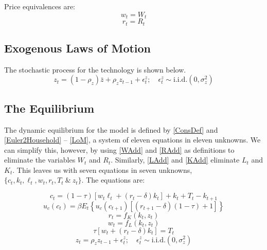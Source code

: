\documentclass[letterpaper,12pt]{article}
\theoremstyle{definition}
\begin{document}
\begin{spacing}{1.5}
		Price equivalences are:
		\begin{equation}\label{WAdd}
		w_t = W_t
		\end{equation}
		\begin{equation}\label{RAdd}
		r_t  = R_t
		\end{equation}

	\subsection{Exogenous Laws of Motion}
		The stochastic process for the technology is shown below.
		\begin{equation}\label{LoM}
		z_t = (1-\rho_z)\bar z +  \rho_z z_{t-1}+ \epsilon^z_t ;\quad \epsilon^z_t\sim\text{i.i.d.}(0,\sigma_z^2)
		\end{equation}

	\subsection{The Equilibrium}
		The dynamic equilibrium for the model is defined by \eqref{ConsDef} and \eqref{Euler2Household} -- \eqref{LoM}, a system of eleven equations in eleven unknowns. We can simplify this, however, by using \eqref{WAdd} and \eqref{RAdd} as definitions to eliminate the variables $W_t$ and $R_t$. Similarly, \eqref{LAdd} and \eqref{KAdd} eliminate $L_t$ and $K_t$. This leaves us with seven equations in seven unknowns, $\{c_t,k_t,\ell_t,w_t,r_t,T_t\>\&\>z_t\}$. The equations are:

		\begin{equation}\label{BC22Household}
		c_t = (1-\tau) \left[w_t\ell_t+(r_t-\delta)k_t\right] + k_t + T_t-k_{t+1}
		\end{equation}
		\begin{equation}\label{Euler22Household}
		u_c(c_t) = \beta E_t\left\{ u_c(c_{t+1})[(r_{t+1}-\delta)(1-\tau)+1] \right\}
		\end{equation}
		\begin{equation}\label{FOC012Firm}
		r_t = f_K(k_t,z_t)
		\end{equation}
		\begin{equation}\label{FOC022Firm}
		w_t = f_L(k_t,z_t)
		\end{equation}
		\begin{equation}\label{GovtTaxes}
		\tau \left[w_t+(r_t-\delta)k_t\right] = T_t
		\end{equation}
		\begin{equation}\label{LoM2}
		z_t = \rho_z z_{t-1}+ \epsilon^z_t ;\quad \epsilon^z_t\sim\text{i.i.d.}(0,\sigma_z^2)
		\end{equation}


\end{spacing}
\end{document}
